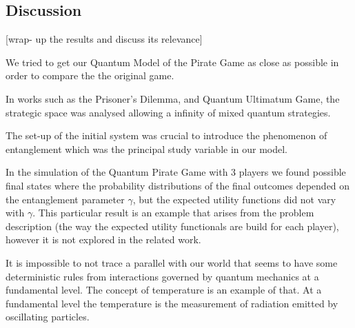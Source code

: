 \clearpage
\subsection{Discussion}
\label{subsec:3playergame:discution}

[wrap- up the results and discuss its relevance]

We tried to get our Quantum Model of the Pirate Game as close as possible in order to compare the the original game. 

In works such as the Prisoner's Dilemma\cite{Letters2002}\cite{Eisert2008}, and Quantum Ultimatum Game\cite{Fra2011}, the strategic space was analysed allowing a infinity of mixed quantum strategies.

The set-up of the initial system was crucial to introduce the phenomenon of entanglement which was the principal study variable in our model.

In the simulation of the Quantum Pirate Game with $3$ players we found possible final states where the probability distributions of the final outcomes depended on the entanglement parameter $\gamma$, but the expected utility functions did not vary with $\gamma$. This particular result is an example that arises from the problem description (the way the expected utility functionals are build for each player), however it is not explored in the related work. 

It is impossible to not trace a parallel with our world that seems to have some deterministic rules from interactions governed by quantum mechanics at a fundamental level. The concept of temperature is an example of that. At a fundamental level the temperature is the measurement of radiation emitted by oscillating particles. 



 






